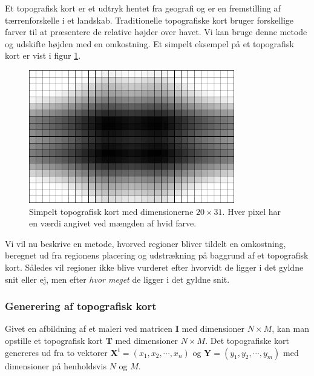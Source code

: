 {
Et topografisk kort er et udtryk hentet fra geografi og er en
fremstilling af tærrenforskelle i et landskab. Traditionelle
topografiske kort bruger forskellige farver til at præsentere de
relative højder over havet. Vi kan bruge denne metode og udskifte højden
med en omkostning.  Et simpelt eksempel på et topografisk kort er vist i
figur \ref{topography_pixel}.

\begin{figure}[!h]
    \begin{center}
        \includegraphics[width=0.8\textwidth]{afsnit/vores_implementation/billeder/udvidet_loesning/topographic_pixelize.png}
    \end{center}
    \caption[]{Simpelt topografisk kort med dimensionerne $20 \times
    31$. Hver pixel har en værdi angivet ved mængden af hvid farve.}
    \label{topography_pixel}
\end{figure}

Vi vil nu beskrive en metode, hvorved regioner bliver tildelt en
omkostning, beregnet ud fra regionens placering og udstrækning på
baggrund af et topografisk kort. Således vil regioner ikke blive
vurderet efter hvorvidt de ligger i det gyldne snit eller ej, men efter
\emph{hvor meget} de ligger i det gyldne snit.

\subsubsection*{Generering af topografisk kort}
Givet en afbildning af et maleri ved matricen $\mathbf{I}$ med dimensioner
$N \times{} M$, kan man opstille et topografisk kort $\mathbf{T}$ med dimensioner
$N \times{} M$. Det topografiske kort genereres ud fra to vektorer $\mathbf{X}^t =
\left(x_1, x_2, \cdots, x_n\right)$ og $\mathbf{Y} = \left(y_1, y_2,
\cdots, y_m\right)$ med dimensioner på henholdsvis $N$ og $M$.

}
